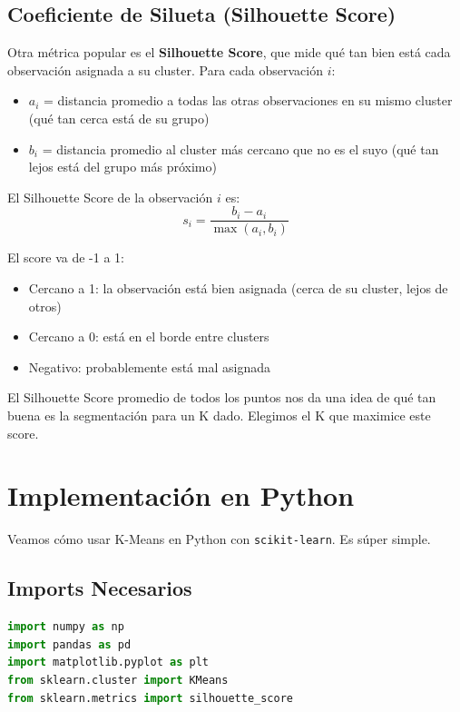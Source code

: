 \documentclass[12pt]{article}
\begin{document}
\subsection{Coeficiente de Silueta (Silhouette Score)}

Otra métrica popular es el \textbf{Silhouette Score}, que mide qué tan bien está cada observación asignada a su cluster. Para cada observación $i$:

\begin{itemize}
    \item $a_i$ = distancia promedio a todas las otras observaciones en su mismo cluster (qué tan cerca está de su grupo)
    \item $b_i$ = distancia promedio al cluster más cercano que no es el suyo (qué tan lejos está del grupo más próximo)
\end{itemize}

El Silhouette Score de la observación $i$ es:
\[
s_i = \frac{b_i - a_i}{\max(a_i, b_i)}
\]

El score va de -1 a 1:
\begin{itemize}
    \item Cercano a 1: la observación está bien asignada (cerca de su cluster, lejos de otros)
    \item Cercano a 0: está en el borde entre clusters
    \item Negativo: probablemente está mal asignada
\end{itemize}

El Silhouette Score promedio de todos los puntos nos da una idea de qué tan buena es la segmentación para un K dado. Elegimos el K que maximice este score.

\section{Implementación en Python}

Veamos cómo usar K-Means en Python con \texttt{scikit-learn}. Es súper simple.

\subsection{Imports Necesarios}

\begin{lstlisting}[language=Python]
import numpy as np
import pandas as pd
import matplotlib.pyplot as plt
from sklearn.cluster import KMeans
from sklearn.metrics import silhouette_score
\end{lstlisting}
\end{document}

